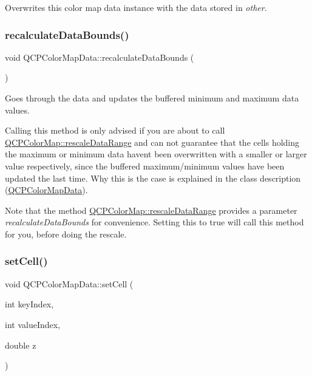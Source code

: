 Overwrites this color map data instance with the data stored in {\itshape other}. \mbox{\label{class_q_c_p_color_map_data_ab235ade8a4d64bd3adb26a99b3dd57ee}} 
\subsubsection{\texorpdfstring{recalculate\+Data\+Bounds()}{recalculateDataBounds()}}
{\footnotesize\ttfamily void Q\+C\+P\+Color\+Map\+Data\+::recalculate\+Data\+Bounds (\begin{DoxyParamCaption}{ }\end{DoxyParamCaption})}

Goes through the data and updates the buffered minimum and maximum data values.

Calling this method is only advised if you are about to call \mbox{\hyperlink{class_q_c_p_color_map_a856608fa3dd1cc290bcd5f29a5575774}{Q\+C\+P\+Color\+Map\+::rescale\+Data\+Range}} and can not guarantee that the cells holding the maximum or minimum data haven\textquotesingle{}t been overwritten with a smaller or larger value respectively, since the buffered maximum/minimum values have been updated the last time. Why this is the case is explained in the class description (\mbox{\hyperlink{class_q_c_p_color_map_data}{Q\+C\+P\+Color\+Map\+Data}}).

Note that the method \mbox{\hyperlink{class_q_c_p_color_map_a856608fa3dd1cc290bcd5f29a5575774}{Q\+C\+P\+Color\+Map\+::rescale\+Data\+Range}} provides a parameter {\itshape recalculate\+Data\+Bounds} for convenience. Setting this to true will call this method for you, before doing the rescale. \mbox{\label{class_q_c_p_color_map_data_a8e75eaf8746596319032a93f3d2d0683}} 
\subsubsection{\texorpdfstring{set\+Cell()}{setCell()}}
{\footnotesize\ttfamily void Q\+C\+P\+Color\+Map\+Data\+::set\+Cell (\begin{DoxyParamCaption}\item[{int}]{key\+Index,  }\item[{int}]{value\+Index,  }\item[{double}]{z }\end{DoxyParamCaption})}

